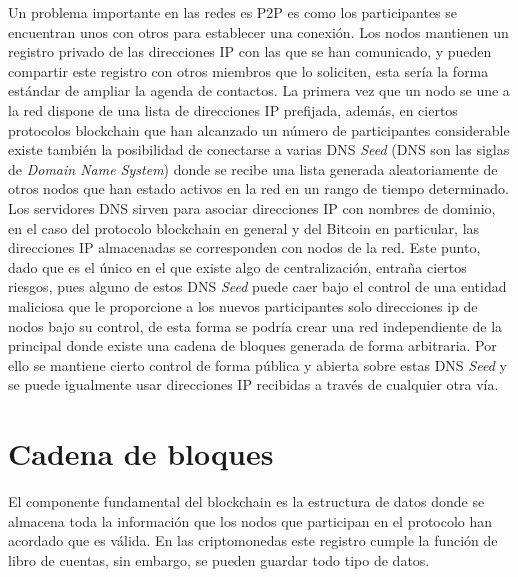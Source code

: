 Un problema importante en las redes es P2P es como los participantes se encuentran unos con otros para establecer una conexión. Los nodos mantienen un registro privado de las direcciones IP con las que se han comunicado, y pueden compartir este registro con otros miembros que lo soliciten, esta sería la forma estándar de ampliar la agenda de contactos. La primera vez que un nodo se une a la red dispone de una lista de direcciones IP prefijada, además, en ciertos protocolos blockchain que han alcanzado un número de participantes considerable existe también la posibilidad de conectarse a varias DNS \textit{Seed} (DNS son las siglas de \textit{Domain Name System}) donde se recibe una lista generada aleatoriamente de otros nodos que han estado activos en la red en un rango de tiempo determinado. Los servidores DNS sirven para asociar direcciones IP con nombres de dominio, en el caso del protocolo blockchain en general y del Bitcoin en particular, las direcciones IP almacenadas se corresponden con nodos de la red. Este punto, dado que es el único en el que existe algo de centralización, entraña ciertos riesgos, pues alguno de estos DNS \textit{Seed} puede caer bajo el control de una entidad maliciosa que le proporcione a los nuevos participantes solo direcciones ip de nodos bajo su control, de esta forma se podría crear una red independiente de la principal donde existe una cadena de bloques generada de forma arbitraria. Por ello se mantiene cierto control de forma pública y abierta sobre estas DNS \textit{Seed} y se puede igualmente usar direcciones IP  recibidas a través de cualquier otra vía.


\section{Cadena de bloques}\label{bloques}
El componente fundamental del blockchain es la estructura de datos donde se almacena toda la información que los nodos que participan en el protocolo han acordado que es válida. En las criptomonedas este registro cumple la función de libro de cuentas, sin embargo, se pueden guardar todo tipo de datos.

